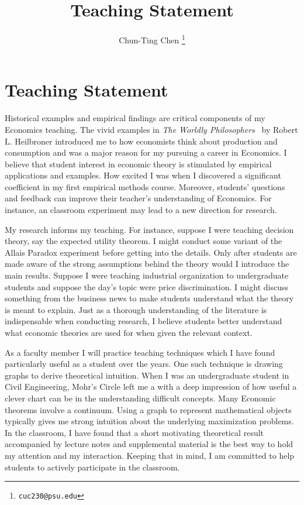 \documentclass[12pt,letter]{article}
\theoremstyle{definition}
\theoremstyle{remark}
\theoremstyle{claim}
\begin{document}

\title {Teaching Statement}
\author{Chun-Ting Chen%
  \thanks{\texttt{cuc230@psu.edu}}}
\date{}


\section*{Teaching Statement}

Historical examples and empirical findings are critical components of my Economics teaching. The vivid examples in \textit{The Worldly Philosophers}~ by Robert L. Heilbroner introduced me to how economists think about production and consumption and was a major reason for my pursuing a career in Economics.  I believe that student interest in economic theory is stimulated by empirical applications and examples. How excited I was when I discovered a significant coefficient in my first empirical methods course. Moreover, students' questions and feedback can improve their teacher's understanding of Economics. For instance, an classroom experiment may lead to a new direction for research.

My research informs my teaching. For instance, suppose I were teaching decision theory, say the expected utility theorem. I might conduct some variant of the Allais Paradox experiment before getting into the details. Only after students are made aware of the strong assumptions behind the theory would I introduce the main results. Suppose I were teaching industrial organization to undergraduate students and suppose the day's topic were price discrimination. I might discuss something from the business news to make students understand what the theory is meant to explain. Just as a thorough understanding of the literature is indispensable when conducting research, I believe students better understand what economic theories are used for when given the relevant context.

As a faculty member I will practice teaching techniques which I have found particularly useful as a student over the years. One such technique is drawing graphs to derive theoretical intuition. When I was an undergraduate student in Civil Engineering, Mohr's Circle left me a with a deep impression of how useful a clever chart can be in the understanding difficult concepts. Many Economic theorems involve a continuum. Using a graph to represent mathematical objects typically gives me strong intuition about the underlying maximization problems. In the classroom, I have found that a short motivating theoretical result accompanied by lecture notes and supplemental material is the best way to hold my attention and my interaction. Keeping that in mind, I am committed to help students to actively participate in the classroom.
\end{document}
